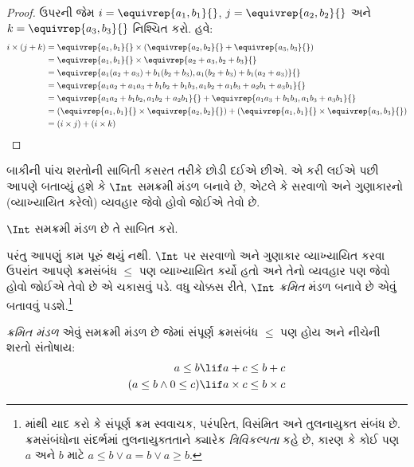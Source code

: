 \begin{proof}
ઉપરની જેમ $i = \equivrep{a_1, b_1}{}$, $j =
\equivrep{a_2,b_2}{}$ અને $k = \equivrep{a_3, b_3}{}$ નિશ્ચિત કરો. હવે:
\begin{align*}
	i \times (j + k)
	&= \equivrep{a_1, b_1}{} \times (\equivrep{a_2,b_2}{} + \equivrep{a_3, b_3}{})\\
	&= \equivrep{a_1, b_1}{} \times \equivrep{a_2 + a_3,b_2+b_3}{}\\
	&= \equivrep{a_1  (a_2 + a_3) + b_1  (b_2+b_3), a_1  (b_2 + b_3) + b_1 (a_2 + a_3)}{}\\
	&= \equivrep{a_1 a_2 + a_1a_3 + b_1 b_2+b_1b_3, a_1 b_2 + a_1b_3 + a_2b_1 + a_3b_1}{}\\
	&= \equivrep{a_1a_2 + b_1b_2, a_1b_2 + a_2b_1}{} + \equivrep{a_1a_3 + b_1b_3, a_1b_3 + a_3b_1}{}\\
	&= (\equivrep{a_1, b_1}{} \times \equivrep{a_2,b_2}{}) + (\equivrep{a_1, b_1}{} \times  \equivrep{a_3, b_3}{})\\
	&= (i \times j) + (i \times k)
\end{align*}
\end{proof}

બાકીની પાંચ શરતોની સાબિતી કસરત તરીકે છોડી દઈએ છીએ. એ કરી લઈએ
પછી આપણે બતાવ્યું હશે કે $\Int$ સમક્રમી મંડળ બનાવે છે, એટલે કે સરવાળો
અને ગુણાકારનો (વ્યાખ્યાયિત કરેલો) વ્યવહાર જેવો હોવો જોઈએ તેવો છે.

\begin{prob}
$\Int$ સમક્રમી મંડળ છે તે સાબિત કરો.
\end{prob}

પરંતુ આપણું કામ પૂરું થયું નથી. $\Int$ પર સરવાળો અને ગુણાકાર
વ્યાખ્યાયિત કરવા ઉપરાંત આપણે ક્રમસંબંધ $\leq$ પણ વ્યાખ્યાયિત કર્યો
હતો અને તેનો વ્યવહાર પણ જેવો હોવો જોઈએ તેવો છે એ ચકાસવું પડે. વધુ
ચોક્કસ રીતે, $\Int$ \emph{ક્રમિત} મંડળ બનાવે છે એવું બતાવવું પડશે.\footnote{
	માંથી યાદ કરો કે સંપૂર્ણ ક્રમ
	સ્વવાચક, પરંપરિત, વિસંમિત અને તુલનાયુક્ત સંબંધ છે. ક્રમસંબંધોના
	સંદર્ભમાં તુલનાયુક્તતાને ક્યારેક \emph{ત્રિવિકલ્પતા} કહે છે, કારણ કે
	કોઈ પણ $a$ અને $b$ માટે $a \leq b \lor a = b \lor a \geq b$.}

\begin{defn}
\emph{ક્રમિત મંડળ} એવું સમક્રમી મંડળ છે જેમાં સંપૂર્ણ ક્રમસંબંધ
$\leq$ પણ હોય અને નીચેની શરતો સંતોષાય:
\begin{align*}
	a \leq b &\lif a + c \leq b + c\\
	(a \leq b \land 0 \leq c) &\lif a \times c \leq b \times c
\end{align*}
\end{defn}

